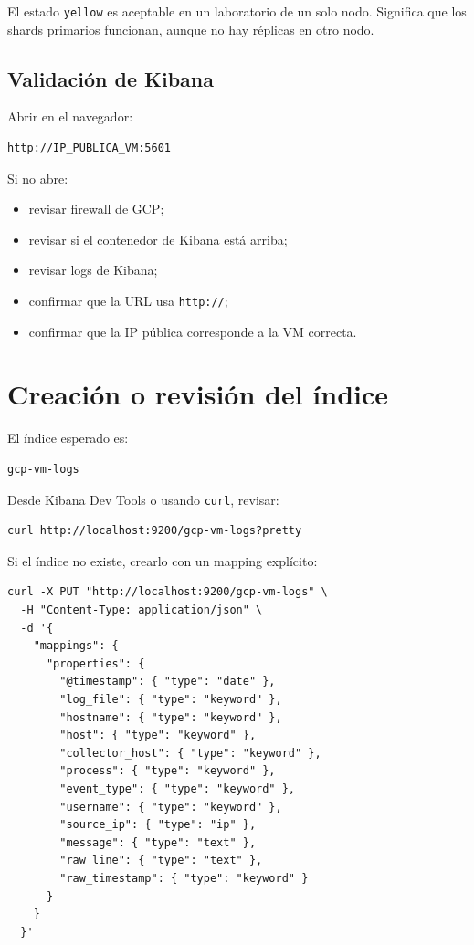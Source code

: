 \documentclass[
  coursetitle={Cómputo Nube y Tecnologías Emergentes},
  coursehours={96},
  coursedate={Verano 2026},
  doctype={Práctica},
  otherlangs={english,french},
  authorname={Lázaro},
  authorsurname={Bustio-Martínez},
  authortitle={PhD},
  role={Profesor Investigador},
  email={lbustio@inaoe.mx},
  phone={5559504000},
  ext={7459},
  institution={Instituto Nacional de Astrofísica, Óptica y Electrónica (INAOE)},
  department={Maestría en Ciencias en Tecnologías de Seguridad},
  address={Luis Enrique Erro 1, Sta. Ma. Tonantzintla, San Andrés Cholula, CP 72840, Puebla, México},
  margin={0.5in}
]{../../lbustio_lecture_notes}
\begin{document}
El estado \texttt{yellow} es aceptable en un laboratorio de un solo nodo. Significa que los shards primarios funcionan, aunque no hay réplicas en otro nodo.

\subsection{Validación de Kibana}

Abrir en el navegador:

\begin{lstlisting}
http://IP_PUBLICA_VM:5601
\end{lstlisting}

Si no abre:

\begin{itemize}
    \item revisar firewall de GCP;
    \item revisar si el contenedor de Kibana está arriba;
    \item revisar logs de Kibana;
    \item confirmar que la URL usa \texttt{http://};
    \item confirmar que la IP pública corresponde a la VM correcta.
\end{itemize}

\section{Creación o revisión del índice}

El índice esperado es:

\begin{lstlisting}
gcp-vm-logs
\end{lstlisting}

Desde Kibana Dev Tools o usando \texttt{curl}, revisar:

\begin{lstlisting}
curl http://localhost:9200/gcp-vm-logs?pretty
\end{lstlisting}

Si el índice no existe, crearlo con un mapping explícito:

\begin{lstlisting}
curl -X PUT "http://localhost:9200/gcp-vm-logs" \
  -H "Content-Type: application/json" \
  -d '{
    "mappings": {
      "properties": {
        "@timestamp": { "type": "date" },
        "log_file": { "type": "keyword" },
        "hostname": { "type": "keyword" },
        "host": { "type": "keyword" },
        "collector_host": { "type": "keyword" },
        "process": { "type": "keyword" },
        "event_type": { "type": "keyword" },
        "username": { "type": "keyword" },
        "source_ip": { "type": "ip" },
        "message": { "type": "text" },
        "raw_line": { "type": "text" },
        "raw_timestamp": { "type": "keyword" }
      }
    }
  }'
\end{lstlisting}
\end{document}

